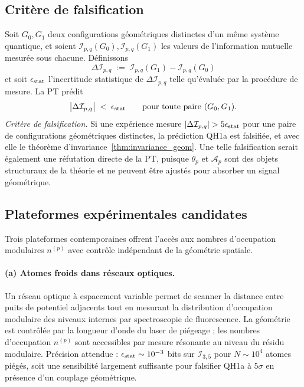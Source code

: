 \subsection{Critère de falsification}
\label{ssec:qh1a_falsification}

Soit $G_0, G_1$ deux configurations géométriques distinctes d'un
même système quantique, et soient
$\mathcal{I}_{p,q}(G_0), \mathcal{I}_{p,q}(G_1)$ les valeurs de
l'information mutuelle mesurée sous chacune. Définissons
\begin{equation}
  \Delta\mathcal{I}_{p,q}
  \;:=\;
  \mathcal{I}_{p,q}(G_1) - \mathcal{I}_{p,q}(G_0)
  \label{eq:Delta_I_def}
\end{equation}
et soit $\epsilon_{\rm stat}$ l'incertitude statistique de
$\Delta\mathcal{I}_{p,q}$ telle qu'évaluée par la procédure de
mesure. La PT prédit
\begin{equation}
  \bigl|\Delta\mathcal{I}_{p,q}\bigr| \;<\; \epsilon_{\rm stat}
  \qquad \text{pour toute paire } (G_0, G_1).
  \label{eq:QH1a_predict}
\end{equation}
\emph{Critère de falsification.} Si une expérience mesure
$|\Delta\mathcal{I}_{p,q}| > 5 \epsilon_{\rm stat}$ pour une
paire de configurations géométriques distinctes, la prédiction
QH1a est falsifiée, et avec elle le théorème
d'invariance~\ref{thm:invariance_geom}. Une telle falsification
serait également une réfutation directe de la PT, puisque
$\theta_p$ et $\mathcal{A}_p$ sont des objets structuraux de la
théorie et ne peuvent être ajustés pour absorber un signal
géométrique.

\subsection{Plateformes expérimentales candidates}
\label{ssec:qh1a_plateformes}

Trois plateformes contemporaines offrent l'accès aux nombres
d'occupation modulaires $n^{(p)}$ avec contrôle indépendant de la
géométrie spatiale.

\paragraph{(a) Atomes froids dans réseaux optiques.}
Un réseau optique à espacement variable permet de scanner la
distance entre puits de potentiel adjacents tout en mesurant la
distribution d'occupation modulaire des niveaux internes par
spectroscopie de fluorescence. La géométrie est contrôlée par la
longueur d'onde du laser de piégeage ; les nombres d'occupation
$n^{(p)}$ sont accessibles par mesure résonante au niveau du
résidu modulaire. Précision attendue : $\epsilon_{\rm stat}
\sim 10^{-3}$ bits sur $\mathcal{I}_{3,5}$ pour
$N \sim 10^4$ atomes piégés, soit une sensibilité largement
suffisante pour falsifier QH1a à $5\sigma$ en présence d'un
couplage géométrique.

